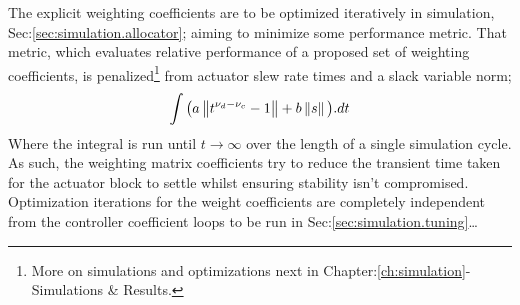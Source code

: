 \par
The explicit weighting coefficients are to be optimized iteratively in simulation, Sec:\ref{sec:simulation.allocator}; aiming to minimize some performance metric. That metric, which evaluates relative performance of a proposed set of weighting coefficients, is penalized\footnote{More on simulations and optimizations next in Chapter:\ref{ch:simulation}-Simulations \& Results.} from actuator slew rate times and a slack variable norm;
\begin{equation}\label{eq:actuator-penalty}
\int \big(a\left\lVert t^{\nu_d-\nu_c}-1\right\rVert+b\left\lVert s\right\rVert\big).dt
\end{equation}
Where the integral is run until $t\rightarrow\infty$ over the length of a single simulation cycle. As such, the weighting matrix coefficients try to reduce the transient time taken for the actuator block to settle whilst ensuring stability isn't compromised. Optimization iterations for the weight coefficients are completely independent from the controller coefficient loops to be run in Sec:\ref{sec:simulation.tuning}\ldots
